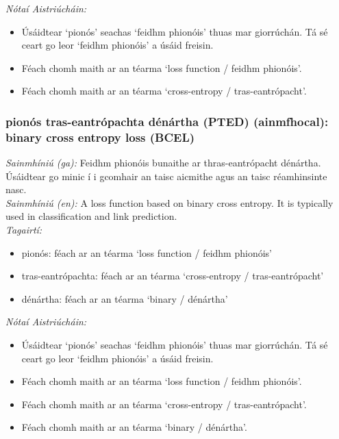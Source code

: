  \noindent \textit{Nótaí Aistriúcháin:}
\begin{itemize}
	\item Úsáidtear `pionós' seachas `feidhm phionóis' thuas mar giorrúchán. Tá sé ceart go leor `feidhm phionóis' a úsáid freisin.
	\item Féach chomh maith ar an téarma `loss function / feidhm phionóis'.
	\item Féach chomh maith ar an téarma `cross-entropy / tras-eantrópacht'.
\end{itemize}


\subsubsection*{pionós tras-eantrópachta dénártha (PTED) (ainmfhocal): binary cross entropy loss (BCEL)}
 \noindent \textit{Sainmhíniú (ga):} Feidhm phionóis bunaithe ar thras-eantrópacht dénártha. Úsáidtear go minic í i gcomhair an taisc aicmithe agus an taisc réamhinsinte nasc.
\\
 \noindent \textit{Sainmhíniú (en):} A loss function based on binary cross entropy. It is typically used in classification and link prediction.
\\
 \noindent \textit{Tagairtí:}
\begin{itemize}
	\item pionós: féach ar an téarma `loss function / feidhm phionóis'
	\item tras-eantrópachta: féach ar an téarma `cross-entropy / tras-eantrópacht'
	\item dénártha: féach ar an téarma `binary / dénártha'
\end{itemize}

 \noindent \textit{Nótaí Aistriúcháin:}
\begin{itemize}
	\item Úsáidtear `pionós' seachas `feidhm phionóis' thuas mar giorrúchán. Tá sé ceart go leor `feidhm phionóis' a úsáid freisin.
	\item Féach chomh maith ar an téarma `loss function / feidhm phionóis'.
	\item Féach chomh maith ar an téarma `cross-entropy / tras-eantrópacht'.
	\item Féach chomh maith ar an téarma `binary / dénártha'.
\end{itemize}


